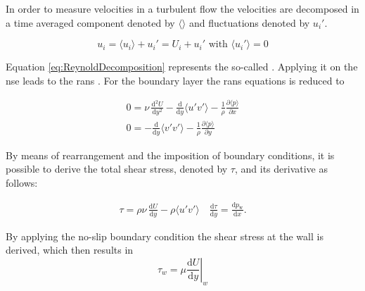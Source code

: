 In order to measure velocities in a turbulent flow the velocities are decomposed in a time averaged component denoted by $\langle \rangle$ and fluctuations denoted by  $u_i'$. 

\begin{equation}
	\label{eq:ReynoldDecomposition}
    u_i = \langle u_i \rangle + u_i' = U_i + u_i' \text{ with } \langle u_i'
\rangle = 0\end{equation}

Equation \ref{eq:ReynoldDecomposition} represents the so-called .
Applying it on the \acrshort{nse} leads to the \acrfull{rans} . 
For the boundary layer the \acrshort{rans} equations is reduced to 

\begin{gather}
    0 = \nu\,\frac{\mathrm{d}^2 U}{\mathrm{d}y^2} - \frac{\mathrm{d}}{\mathrm{d}y}\langle u'v'\rangle - \frac{1}{\rho}\frac{\partial \langle p\rangle}{\partial x} \\
    0 = -\frac{\mathrm{d}}{\mathrm{d}y}\langle v'v'\rangle - \frac{1}{\rho}\frac{\partial \langle p\rangle}{\partial y} 
\end{gather}

By means of rearrangement and the imposition of boundary conditions, it is possible to derive the total shear stress, denoted by $\tau$, and its derivative as follows:

\begin{gather}
    \tau = \rho\nu\,\frac{\mathrm{d} U}{\mathrm{d}y} - \rho\langle u'v'\rangle \quad
    \frac{\mathrm{d}\tau}{\mathrm{d}y} = \frac{\mathrm{d}p_{\mathrm{w}}}{\mathrm{d}x}.
\end{gather}


By applying  the no-slip boundary condition the shear stress at the wall is derived, which then results in
\begin{equation}
    \tau_w = \mu \left. \frac{\mathrm{d}U}{\mathrm{d}y} \right|_w 
\end{equation}




